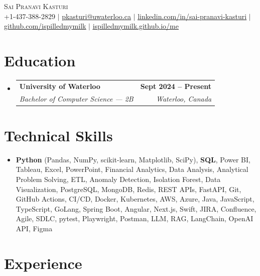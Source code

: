 \documentclass[letterpaper,10pt]{article}
\makeatletter
\newcommand{\resumeSubheading}[4]{
  \vspace{-1pt}\item
    \begin{tabular*}{1.0\textwidth}[t]{l@{\extracolsep{\fill}}r}
      \textbf{#1} & \textbf{\small #2} \\
      \textit{\small#3} & \textit{\small #4} \\[-2pt]
    \end{tabular*}\vspace{-7pt}
}
\newcommand{\resumeSubHeadingListStart}{\begin{itemize}[leftmargin=0.0in, label={}]}
\newcommand{\resumeSubHeadingListEnd}{\end{itemize}}
\makeatother
\begin{document}

\vspace{-28pt}
\begin{center}
    {\Huge \scshape Sai Pranavi Kasturi} \\
    \small +1-437-388-2829 $|$ \underline{pkasturi@uwaterloo.ca} $|$
    \href{https://linkedin.com/in/sai-pranavi-kasturi-704807298}{\underline{linkedin.com/in/sai-pranavi-kasturi}} $|$
    \href{https://github.com/ispilledmymilk}{\underline{github.com/ispilledmymilk}} $|$
    \href{https://ispilledmymilk.github.io/me/}{\underline{ispilledmymilk.github.io/me}}
    \vspace{-10pt}
\end{center}

\vspace{-10pt}
\section{Education}
  \resumeSubHeadingListStart
    \resumeSubheading
      {University of Waterloo}{Sept 2024 -- Present}
      {Bachelor of Computer Science --- 2B}{Waterloo, Canada}
  \resumeSubHeadingListEnd
\vspace{-8pt}

\section{Technical Skills}
\begin{itemize}[leftmargin=0.05in, label={}]
  \small\item{
    \textbf{Python} (Pandas, NumPy, scikit-learn, Matplotlib, SciPy), \textbf{SQL}, Power BI, Tableau, Excel, PowerPoint, Financial Analytics, Data Analysis, Analytical Problem Solving, ETL, Anomaly Detection, Isolation Forest, Data Visualization, PostgreSQL, MongoDB, Redis, REST APIs, FastAPI, Git, GitHub Actions, CI/CD, Docker, Kubernetes, AWS, Azure, Java, JavaScript, TypeScript, GoLang, Spring Boot, Angular, Next.js, Swift, JIRA, Confluence, Agile, SDLC, pytest, Playwright, Postman, LLM, RAG, LangChain, OpenAI API, Figma
  }
\end{itemize}
\vspace{-18pt}

\vspace{1.20pt}
\section{Experience}
\end{document}
